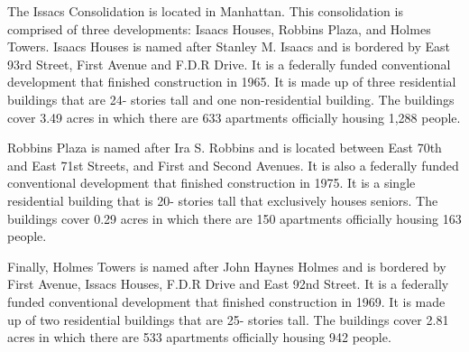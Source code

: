       

    

The Issacs Consolidation is located in Manhattan. This consolidation is comprised of three developments: Isaacs Houses, Robbins Plaza, and Holmes Towers. Isaacs Houses is named after Stanley M. Isaacs and is bordered by East 93rd Street, First Avenue and F.D.R Drive. It is a federally funded conventional development that finished construction in 1965. It is made up of three residential buildings that are 24- stories tall and one non-residential building. The buildings cover 3.49 acres in which there are 633 apartments officially housing 1,288 people.  

Robbins Plaza is named after Ira S. Robbins and is located between East 70th and East 71st Streets, and First and Second Avenues. It is also a federally funded conventional development that finished construction in 1975. It is a single residential building that is 20- stories tall that exclusively houses seniors. The buildings cover 0.29 acres in which there are 150 apartments officially housing 163 people.  

Finally, Holmes Towers is named after John Haynes Holmes and is bordered by First Avenue, Issacs Houses, F.D.R Drive and East 92nd Street. It is a federally funded conventional development that finished construction in 1969. It is made up of two residential buildings that are 25- stories tall. The buildings cover 2.81 acres in which there are 533 apartments officially housing 942 people.  